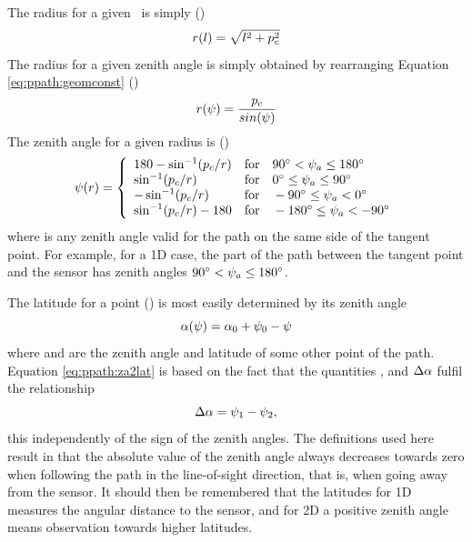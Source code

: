 The radius for a given \PpathLng\ is simply ()
\begin{equation}
  r(l) = \sqrt{l^2+p_c^2} 
  \label{eq:ppath:l2r}
\end{equation}
The radius for a given zenith angle is simply obtained by rearranging 
Equation \ref{eq:ppath:geomconst} ()
\begin{equation}
  r(\psi) = \frac{p_c}{sin(\psi)}
  \label{eq:ppath:za2r}
\end{equation}
The zenith angle for a given radius is ()
\begin{equation}
  \psi(r) = \left\{
   \begin{array}{ll}
    180 - \sin^{-1}(p_c/r) & 
                   \textrm{for}\quad 90^\circ < \psi_{a} \leq 180^\circ\\
    \sin^{-1}(p_c/r) & 
                   \textrm{for}\quad 0^\circ \leq \psi_{a} \leq 90^\circ\\
    -\sin^{-1}(p_c/r) & 
                   \textrm{for}\quad -90^\circ \leq \psi_{a} < 0^\circ\\
    \sin^{-1}(p_c/r) - 180 & 
                  \textrm{for}\quad -180^\circ \leq \psi_{a} < -90^\circ\\
   \end{array}   \right.
  \label{eq:ppath:r2psi}
\end{equation}
where  is any zenith angle valid for the path on the same
side of the tangent point. For example, for a 1D case, the part of the
path between the tangent point and the sensor has zenith angles
$90^\circ < \psi_{a} \leq 180^\circ$.

The latitude for a point () is most 
easily determined by its zenith angle \\

\begin{equation}
  \alpha(\psi) = \alpha_{0} + \psi_{0} - \psi
  \label{eq:ppath:za2lat}
\end{equation}
where  and  are the zenith angle and latitude of some 
other point of the path. Equation \ref{eq:ppath:za2lat} is based on the 
fact that the quantities ,  and $\Delta\alpha$
fulfil the relationship
\begin{equation}
  \Delta\alpha = \psi_{1} - \psi_{2},
  \label{eq:ppath:dlat}
\end{equation}
this independently of the sign of the zenith angles. The definitions
used here result in that the absolute value of the zenith angle always
decreases towards zero when following the path in the line-of-sight
direction, that is, when going away from the sensor. It should then be
remembered that the latitudes for 1D measures the angular distance to
the sensor, and for 2D a positive zenith angle means observation
towards higher latitudes.

